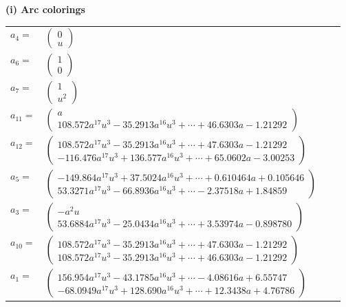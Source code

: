 \documentclass[1p]{elsarticle_modified}
\theoremstyle{definition}
\begin{document}
\flushleft \textbf{(i) Arc colorings}\\
\begin{tabular}{m{7pt} m{180pt} m{7pt} m{180pt} }
\flushright $a_{4}=$&$\begin{pmatrix}0\\u\end{pmatrix}$ \\
\flushright $a_{6}=$&$\begin{pmatrix}1\\0\end{pmatrix}$ \\
\flushright $a_{7}=$&$\begin{pmatrix}1\\u^2\end{pmatrix}$ \\
\flushright $a_{11}=$&$\begin{pmatrix}a\\108.572 a^{17} u^{3}-35.2913 a^{16} u^{3}+\cdots+46.6303 a-1.21292\end{pmatrix}$ \\
\flushright $a_{12}=$&$\begin{pmatrix}108.572 a^{17} u^{3}-35.2913 a^{16} u^{3}+\cdots+47.6303 a-1.21292\\-116.476 a^{17} u^{3}+136.577 a^{16} u^{3}+\cdots+65.0602 a-3.00253\end{pmatrix}$ \\
\flushright $a_{5}=$&$\begin{pmatrix}-149.864 a^{17} u^{3}+37.5024 a^{16} u^{3}+\cdots+0.610464 a+0.105646\\53.3271 a^{17} u^{3}-66.8936 a^{16} u^{3}+\cdots-2.37518 a+1.84859\end{pmatrix}$ \\
\flushright $a_{3}=$&$\begin{pmatrix}- a^2 u\\53.6884 a^{17} u^{3}-25.0434 a^{16} u^{3}+\cdots+3.53974 a-0.898780\end{pmatrix}$ \\
\flushright $a_{10}=$&$\begin{pmatrix}108.572 a^{17} u^{3}-35.2913 a^{16} u^{3}+\cdots+47.6303 a-1.21292\\108.572 a^{17} u^{3}-35.2913 a^{16} u^{3}+\cdots+46.6303 a-1.21292\end{pmatrix}$ \\
\flushright $a_{1}=$&$\begin{pmatrix}156.954 a^{17} u^{3}-43.1785 a^{16} u^{3}+\cdots-4.08616 a+6.55747\\-68.0949 a^{17} u^{3}+128.690 a^{16} u^{3}+\cdots+12.3438 a+4.76786\end{pmatrix}$ \\

\end{tabular}
\end{document}
